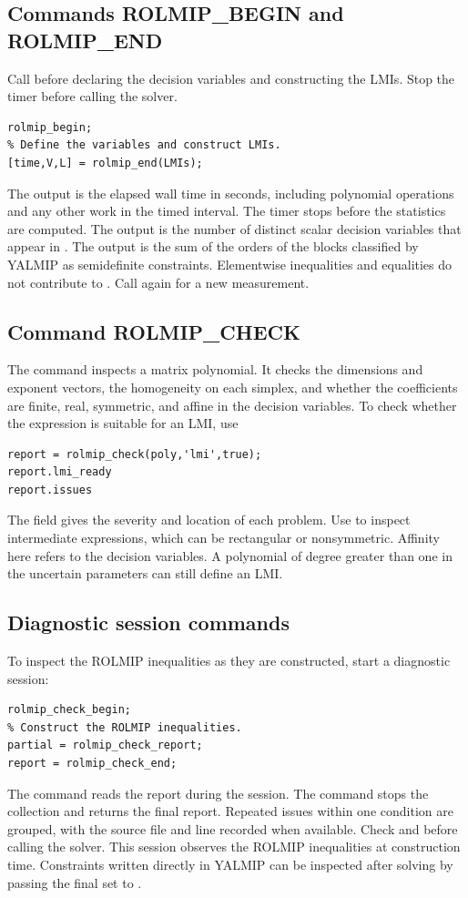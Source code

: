 \documentclass[english,11pt]{article}
\theoremstyle{break} \theorembodyfont{\small\rm}
\begin{document}
\subsection*{Commands ROLMIP\_BEGIN and ROLMIP\_END}
Call  before declaring the decision variables and
constructing the LMIs. Stop the timer before calling the solver.
\begin{lstlisting}
rolmip_begin;
% Define the variables and construct LMIs.
[time,V,L] = rolmip_end(LMIs);
\end{lstlisting}
The output  is the elapsed wall time in seconds, including
polynomial operations and any other work in the timed interval. The timer
stops before the statistics are computed. The output  is the
number of distinct scalar decision variables that appear in .
The output  is the sum of the orders of the blocks classified by
YALMIP as semidefinite constraints. Elementwise inequalities and equalities
do not contribute to . Call  again for a new
measurement.

\subsection*{Command ROLMIP\_CHECK}
The command  inspects a matrix polynomial. It checks
the dimensions and exponent vectors, the homogeneity on each simplex, and
whether the coefficients are finite, real, symmetric, and affine in the
decision variables. To check whether the expression is suitable for an LMI,
use
\begin{lstlisting}
report = rolmip_check(poly,'lmi',true);
report.lmi_ready
report.issues
\end{lstlisting}
The field  gives the severity and location of each problem.
Use  to inspect intermediate expressions, which
can be rectangular or nonsymmetric. Affinity here refers to the decision
variables. A polynomial of degree greater than one in the uncertain
parameters can still define an LMI.

\subsection*{Diagnostic session commands}
To inspect the ROLMIP inequalities as they are constructed, start a
diagnostic session:
\begin{lstlisting}
rolmip_check_begin;
% Construct the ROLMIP inequalities.
partial = rolmip_check_report;
report = rolmip_check_end;
\end{lstlisting}
The command  reads the report during the session.
The command  stops the collection and returns the
final report. Repeated issues within one condition are grouped, with the
source file and line recorded when available. Check
 and  before calling the
solver. This session observes the ROLMIP inequalities at construction time.
Constraints written directly in YALMIP can be inspected after solving by
passing the final set to .
\end{document}
